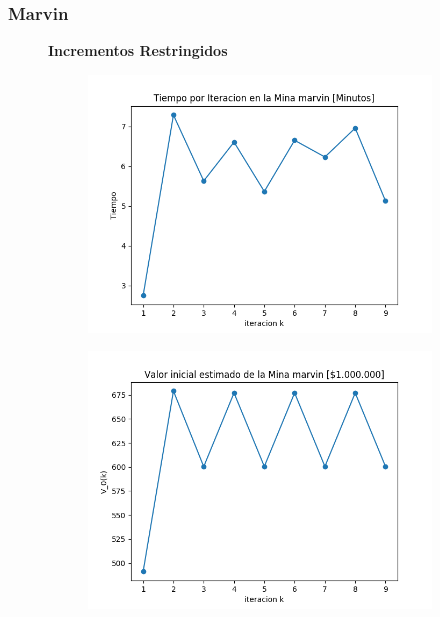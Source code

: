 \documentclass[12pt,letterpaper]{article}
\begin{document}
\subsubsection{Marvin}

\begin{figure}[H]
  \captionsetup[subfigure]{labelformat=empty}
  \centering
  \textbf{Incrementos Restringidos}
  
  \begin{subfigure}[b]{0.4\textwidth}
     \includegraphics[width=\textwidth]{Graficos/FiltradosCauchyRestringidos/marvinml_inc_times..png}
     \caption{}
     \label{fig:ex1}
  \end{subfigure}
  \begin{subfigure}[b]{0.4\textwidth}
     \includegraphics[width=\textwidth]{Graficos/FiltradosCauchyRestringidos/marvinml_inc_v_k..png}
     \caption{}
     \label{fig:ex2}
  \end{subfigure}
\end{figure}
\end{document}
